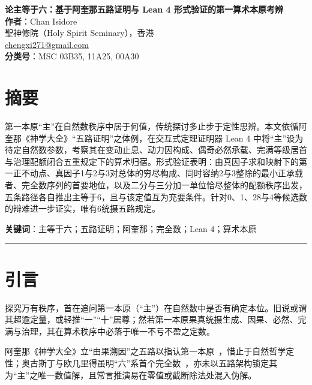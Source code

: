 \documentclass[11pt,a4paper]{ctexart}
\begin{document}
\pagestyle{plain}

\begin{center}
  {\LARGE\sffamily\bfseries 论主等于六：基于阿奎那五路证明与 Lean 4 形式验证的第一算术本原考辨}\\[1.2em]
  {\normalsize \textbf{作者}：Chan Isidore}\\[0.2em]
{\small 聖神修院（Holy Spirit Seminary），香港}\\[0.2em]
{\small \href{mailto:chengxi271@gmail.com}{chengxi271@gmail.com}}\\[0.4em]
  {\small \textbf{分类号}：MSC 03B35, 11A25, 00A30}
\end{center}

\vspace{0.8em}

\section*{摘要}

第一本原``主''在自然数秩序中居于何值，传统探讨多止步于定性思辨。本文依循阿奎那《神学大全》``五路证明''之体例，在交互式定理证明器 Lean 4 中将``主''设为待定自然数参数，考察其在变动止息、动力因构成、偶奇必然承载、完满等级居首与治理配额闭合五重规定下的算术归宿。形式验证表明：由真因子求和映射下的第一正不动点、真因子1与2与3对总体的穷尽构成、同时容纳2与3整除的最小正承载者、完全数序列的首要地位，以及二分与三分加一单位恰尽整体的配额秩序出发，五条路径各自推出主等于6，且与该定值互为充要条件。针对0、1、28与4等候选数的辩难进一步证实，唯有6统摄五路规定。

\noindent\textbf{关键词}：主等于六；五路证明；阿奎那；完全数；Lean 4；算术本原

\vspace{0.6em}
\hrule
\vspace{0.8em}

\section{引言}

探究万有秩序，首在追问第一本原（``主''）在自然数中是否有确定本位。旧说或谓其超逾定量，或轻推``一''``十''居尊；然若第一本原果真统摄生成、因果、必然、完满与治理，其在算术秩序中必落于唯一不亏不盈之定数。

阿奎那《神学大全》立``由果溯因''之五路以指认第一本原~\cite{aquinas}，惜止于自然哲学定性；奥古斯丁与欧几里得虽明``六''系首个完全数~\cite{augustine,euclid}，亦未以五路架构锁定其为``主''之唯一数值解，且常言推演易在零值或截断除法处混入伪解。
\end{document}
